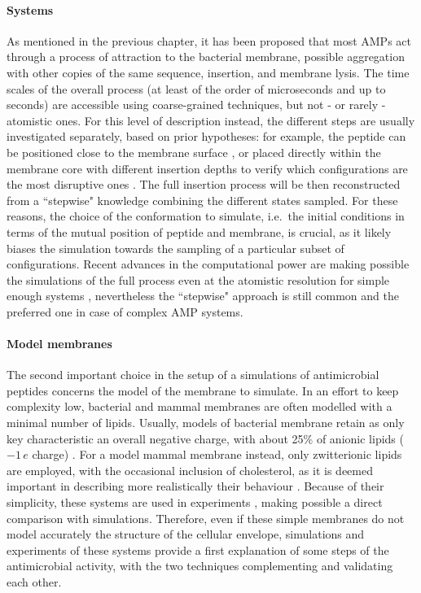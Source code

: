 \paragraph{Systems} As mentioned in the previous chapter, it has been proposed that most AMPs act through a process of attraction to the bacterial membrane, possible aggregation with other copies of the same sequence, insertion, and membrane lysis. The time scales of the overall process (at least of the order of microseconds and up to seconds) are accessible using coarse-grained techniques, but not - or rarely - atomistic ones.
%
For this level of description instead, the different steps are usually investigated separately, based on prior hypotheses: for example, the peptide can be positioned close to the membrane surface \citep{Wang2012}, or placed directly within the membrane core with different insertion depths to verify which configurations are the most disruptive ones \citep{Lipkin2017}. The full insertion process will be then reconstructed from a ``stepwise" knowledge combining the different states sampled.
%
For these reasons, the choice of the conformation to simulate, i.e.\ the initial conditions in terms of the mutual position of peptide and membrane, is crucial, as it likely biases the simulation towards the sampling of a particular subset of configurations. Recent advances in the computational power are making possible the simulations of the full process even at the atomistic resolution for simple enough systems \citep{Ulmschneider2017,Sun2015}, nevertheless the ``stepwise" approach is still common and the preferred one in case of complex AMP systems.

\paragraph{Model membranes} The second important choice in the setup of a simulations of antimicrobial peptides concerns the model of the membrane to simulate. In an effort to keep complexity low, bacterial and mammal membranes are often modelled with a minimal number of lipids.
%
Usually, models of bacterial membrane retain as only key characteristic an overall negative charge, with about 25\% of anionic lipids ($-1\,e$ charge) \citep{Lipkin2017,Wang2012,Zhao2018,Chen2019}.
For a model mammal membrane instead, only zwitterionic lipids are employed, with the occasional inclusion of cholesterol, as it is deemed important in describing more realistically their behaviour \citep{Lipkin2017,Wang2012,Zhao2018,Chen2019,Risselada2008}.
Because of their simplicity, these systems are used in experiments \citep{Castelletto2016,Tang2009,Glukhov2005}, making possible a direct comparison with simulations.
Therefore, even if these simple membranes do not model accurately the structure of the cellular envelope, simulations and experiments of these systems provide a first explanation of some steps of the antimicrobial activity, with the two techniques complementing and validating each other.

